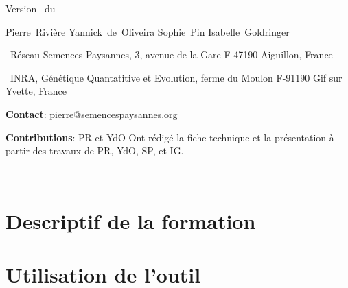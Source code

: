 


\graphicspath{{../../ressources/figures/}}




\pagestyle{empty}

\begin{center}

\headtitlepagefiche{\logoRSPDEAP}{\formationFa}

\vfill

\large
Version \versionFFa~du \dateversionFFa

\vfill

\normalsize

Pierre~Rivière \hspace{.5cm}
Yannick~de~Oliveira \hspace{.5cm}
Sophie~Pin \hspace{.5cm}
Isabelle~Goldringer \\

\end{center}

\small
\noindent{}~Réseau Semences Paysannes, 3, avenue de la Gare F-47190 Aiguillon, France 

\noindent{}~INRA, Génétique Quantatitive et Evolution, ferme du Moulon F-91190 Gif sur Yvette, France

\noindent\up{*} \textbf{Contact}: \href{mailto:pierre@semencespaysannes.org}{\textcolor{mln-green} {pierre@semencespaysannes.org}}


\noindent\textbf{Contributions}: PR et YdO Ont rédigé la fiche technique et la présentation à partir des travaux de PR, YdO, SP, et IG.

\normalsize

\vfill


\newpage ~\\ \newpage \tableofcontents \newpage \pagestyle{plain}

\section*{Descriptif de la formation}


\section{Utilisation de l'outil \BDD} 

